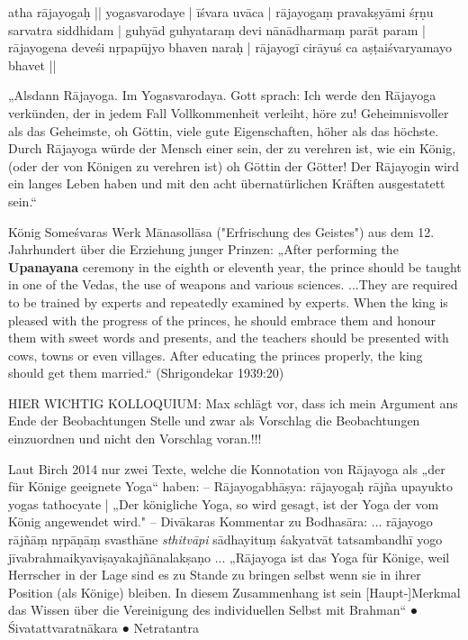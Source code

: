 atha rājayogaḥ || yogasvarodaye | īśvara uvāca |
rājayogaṃ pravakṣyāmi śṛṇu sarvatra siddhidam |
guhyād guhyataraṃ devi nānādharmaṃ parāt param |
rājayogena deveśi nṛpapūjyo bhaven naraḥ |
rājayogī cirāyuś ca aṣṭaiśvaryamayo bhavet ||

„Alsdann Rājayoga. Im Yogasvarodaya. Gott sprach:
Ich werde den Rājayoga verkünden, der in jedem Fall Vollkommenheit verleiht, höre zu!
Geheimnisvoller als das Geheimste, oh Göttin, viele gute Eigenschaften, höher als das höchste. 
Durch Rājayoga würde der Mensch einer sein, der zu verehren ist, wie ein König,(oder der von Königen zu verehren ist) oh Göttin der
Götter! Der Rājayogin wird ein langes Leben haben und mit den acht übernatürlichen Kräften
ausgestatett sein.“



König Someśvaras Werk Mānasollāsa ("Erfrischung des Geistes") aus dem 12. Jahrhundert über
die Erziehung junger Prinzen:
„After performing the \textbf{Upanayana} ceremony in the eighth or eleventh year, the prince should be taught in
one of the Vedas, the use of weapons and various sciences. ...They are required to be trained by experts
and repeatedly examined by experts. When the king is pleased with the progress of the princes, he
should embrace them and honour them with sweet words and presents, and the teachers should be
presented with cows, towns or even villages. After educating the princes properly, the king should get
them married.“
(Shrigondekar 1939:20)

HIER WICHTIG KOLLOQUIUM: Max schlägt vor, dass ich mein Argument ans Ende der Beobachtungen Stelle und zwar als Vorschlag die Beobachtungen einzuordnen und nicht den Vorschlag voran.!!!



Laut Birch 2014 nur zwei Texte, welche die Konnotation von Rājayoga als „der für Könige geeignete Yoga“ haben:
–
Rājayogabhāṣya:
rājayogaḥ rājña upayukto yogas tathocyate |
„Der königliche Yoga, so wird gesagt, ist der Yoga der vom König angewendet wird."
–
Divākaras Kommentar zu Bodhasāra:
... rājayogo rājñāṃ nṛpāṇāṃ svasthāne \emph{sthitvāpi} sādhayituṃ śakyatvāt tatsambandhī yogo
jīvabrahmaikyaviṣayakajñānalakṣaṇo ...
„Rājayoga ist das Yoga für Könige, weil Herrscher in der Lage sind es zu Stande zu bringen selbst wenn sie in ihrer Position
(als Könige) bleiben. In diesem Zusammenhang ist sein [Haupt-]Merkmal das Wissen über die Vereinigung des
individuellen Selbst mit Brahman“
● Śivatattvaratnākara
● Netratantra


